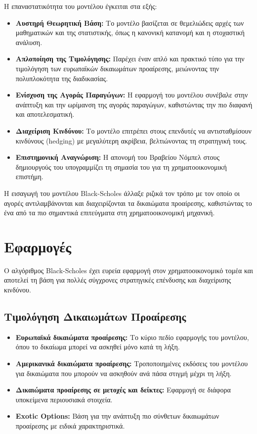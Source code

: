 Η επαναστατικότητα του μοντέλου έγκειται στα εξής:
\begin{itemize}
    \item \textbf{Αυστηρή Θεωρητική Βάση:} Το μοντέλο βασίζεται σε θεμελιώδεις αρχές των μαθηματικών και της στατιστικής, όπως η κανονική κατανομή και η στοχαστική ανάλυση.
    \item \textbf{Απλοποίηση της Τιμολόγησης:} Παρέχει έναν απλό και πρακτικό τύπο για την τιμολόγηση των ευρωπαϊκών δικαιωμάτων προαίρεσης, μειώνοντας την πολυπλοκότητα της διαδικασίας.
    \item \textbf{Ενίσχυση της Αγοράς Παραγώγων:} Η εφαρμογή του μοντέλου συνέβαλε στην ανάπτυξη και την ωρίμανση της αγοράς παραγώγων, καθιστώντας την πιο διαφανή και αποτελεσματική.
    \item \textbf{Διαχείριση Κινδύνου:} Το μοντέλο επιτρέπει στους επενδυτές να αντισταθμίσουν κινδύνους (hedging) με μεγαλύτερη ακρίβεια, βελτιώνοντας τη στρατηγική τους.
    \item \textbf{Επιστημονική Αναγνώριση:} Η απονομή του Βραβείου Νόμπελ στους δημιουργούς του υπογραμμίζει τη σημασία του για τη χρηματοοικονομική επιστήμη.
\end{itemize}

Η εισαγωγή του μοντέλου Black-Scholes άλλαξε ριζικά τον τρόπο με τον οποίο οι αγορές αντιλαμβάνονται και διαχειρίζονται τα δικαιώματα προαίρεσης, καθιστώντας το ένα από τα πιο σημαντικά επιτεύγματα στη χρηματοοικονομική μηχανική.

\section{Εφαρμογές}

Ο αλγόριθμος Black-Scholes έχει ευρεία εφαρμογή στον χρηματοοικονομικό τομέα και αποτελεί τη βάση για πολλές σύγχρονες στρατηγικές επένδυσης και διαχείρισης κινδύνου.

\subsection{Τιμολόγηση Δικαιωμάτων Προαίρεσης}

\begin{itemize}
  \item \textbf{Ευρωπαϊκά δικαιώματα προαίρεσης:} Το κύριο πεδίο εφαρμογής του μοντέλου, όπου το δικαίωμα μπορεί να ασκηθεί μόνο κατά τη λήξη.
  \item \textbf{Αμερικανικά δικαιώματα προαίρεσης:} Τροποποιημένες εκδόσεις του μοντέλου για δικαιώματα που μπορούν να ασκηθούν ανά πάσα στιγμή μέχρι τη λήξη.
  \item \textbf{Δικαιώματα προαίρεσης σε μετοχές και δείκτες:} Εφαρμογή σε διάφορα υποκείμενα περιουσιακά στοιχεία.
  \item \textbf{Exotic Options:} Βάση για την ανάπτυξη πιο σύνθετων δικαιωμάτων προαίρεσης με ειδικά χαρακτηριστικά.
\end{itemize}

